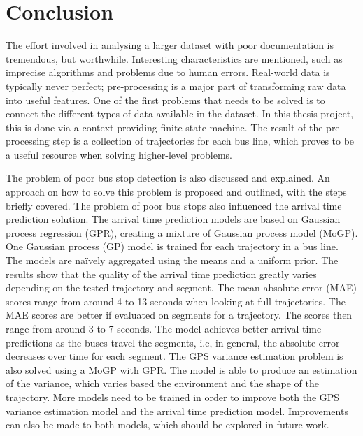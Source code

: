 \chapter{Conclusion}
\label{cha:conclusion}

The effort involved in analysing a larger dataset with poor documentation is tremendous, but worthwhile.
Interesting characteristics are mentioned, such as imprecise algorithms and problems due to human errors.
Real-world data is typically never perfect; pre-processing is a major part of transforming raw data into useful features.
One of the first problems that needs to be solved is to connect the different types of data available in the dataset.
In this thesis project, this is done via a context-providing finite-state machine.
The result of the pre-processing step is a collection of trajectories for each bus line, which proves to be a useful resource when solving higher-level problems.

The problem of poor bus stop detection is also discussed and explained.
An approach on how to solve this problem is proposed and outlined, with the steps briefly covered.
The problem of poor bus stops also influenced the arrival time prediction solution.
The arrival time prediction models are based on Gaussian process regression (GPR), creating a mixture of Gaussian process model (MoGP).
One Gaussian process (GP) model is trained for each trajectory in a bus line.
The models are naïvely aggregated using the means and a uniform prior.
The results show that the quality of the arrival time prediction greatly varies depending on the tested trajectory and segment.
The mean absolute error (MAE) scores range from around 4 to 13 seconds when looking at full trajectories.
The MAE scores are better if evaluated on segments for a trajectory.
The scores then range from around 3 to 7 seconds.
The model achieves better arrival time predictions as the buses travel the segments, i.e, in general, the absolute error decreases over time for each segment.
The GPS variance estimation problem is also solved using a MoGP with GPR. 
The model is able to produce an estimation of the variance, which varies based the environment and the shape of the trajectory.
More models need to be trained in order to improve both the GPS variance estimation model and the arrival time prediction model.
Improvements can also be made to both models, which should be explored in future work. 